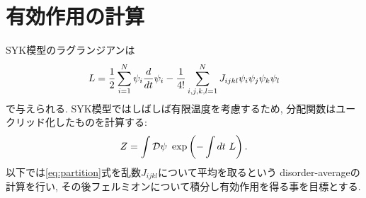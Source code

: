 \section{有効作用の計算 \label{app:effective_action}}

	SYK模型のラグランジアンは
	\begin{align}
	L = \frac{1}{2}\sum_{i = 1}^{N} \psi_i \frac{d}{dt} \psi_i
		- \frac{1}{4!} \sum_{i,j,k,l = 1}^{N} J_{ijkl} \psi_i\psi_j\psi_k\psi_l
	\label{eq:laglangian}
	\end{align}
	で与えられる. 
	SYK模型ではしばしば有限温度を考慮するため, 分配関数はユークリッド化したものを計算する:
	\begin{align}
	Z = \int \mathcal{D}\psi \  \exp\left(- \int dt\  L\right).
	\label{eq:partition}
	\end{align}
	以下では\eqref{eq:partition}式を乱数$J_{ijkl}$について平均を取るという
	disorder-averageの計算を行い, その後フェルミオンについて積分し有効作用を得る事を目標とする. 

